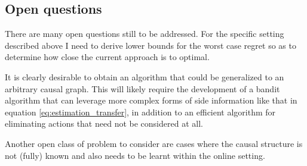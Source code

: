 \documentclass[11pt,a4paper]{article}
\begin{document}
\subsection{Open questions}

There are many open questions still to be addressed. For the specific setting described above I need to derive lower bounds for the worst case regret so as to determine how close the current approach is to optimal. 

It is clearly desirable to obtain an algorithm that could be generalized to an arbitrary causal graph. This will likely require the development of a bandit algorithm that can leverage more complex forms of side information like that in equation \ref{eq:estimation_transfer}, in addition to an efficient algorithm for eliminating actions that need not be considered at all.

Another open class of problem to consider are cases where the causal structure is not (fully) known and also needs to be learnt within the online setting.


\end{document}
